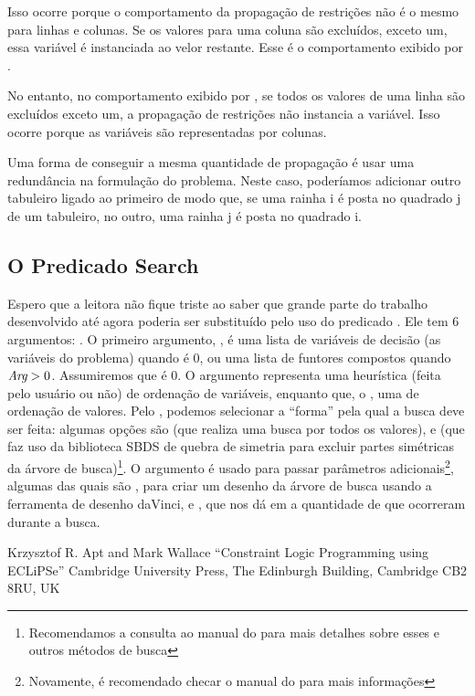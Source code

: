 \documentclass{article}
\begin{document}
Isso ocorre porque o comportamento da propagação de restrições não é o mesmo para linhas e colunas.
Se os valores para uma coluna são excluídos, exceto um, essa variável é instanciada ao velor
restante. Esse é o comportamento exibido por .

No entanto, no comportamento exibido por , se todos os valores de uma linha
são excluídos exceto um, a propagação de restrições não instancia a variável. Isso ocorre porque as
variáveis são representadas por colunas.

Uma forma de conseguir a mesma quantidade de propagação é usar uma redundância na formulação do
problema. Neste caso, poderíamos adicionar outro tabuleiro ligado ao primeiro de modo que, se uma
rainha i é posta no quadrado j de um tabuleiro, no outro, uma rainha j é posta no quadrado i.

\subsection{O Predicado Search}

Espero que a leitora não fique triste ao saber que grande parte do trabalho desenvolvido até agora
poderia ser substituído pelo uso do predicado . Ele tem 6 argumentos:
. O primeiro argumento,
, é uma lista de variáveis de decisão (as variáveis do problema) quando  é 0, ou
uma lista de funtores compostos quando $\textit{Arg} > 0$. Assumiremos que  é 0. O argumento 
representa uma heurística (feita pelo usuário ou não) de ordenação de variáveis, enquanto que, o
, uma de ordenação de valores. Pelo , podemos selecionar a ``forma'' pela
qual a busca deve ser feita: algumas opções são  (que realiza uma busca por
todos os valores), e  (que faz uso da biblioteca SBDS de quebra de simetria para
excluir partes simétricas da árvore de busca)\footnote{Recomendamos a consulta ao manual do \eclipse
para mais detalhes sobre esses e outros métodos de busca}. O argumento  é usado para
passar parâmetros adicionais\footnote{Novamente, é recomendado checar o manual do \eclipse para mais
informações}, algumas das quais são , para criar um desenho da
árvore de busca usando a ferramenta de desenho daVinci, e , que nos dá em
 a quantidade de  que ocorreram durante a busca.




  \begin{thebibliography}{2}

    Krzysztof R. Apt and Mark Wallace
    ``Constraint Logic Programming using ECLiPSe''
    Cambridge University Press,
    The Edinburgh Building, Cambridge CB2 8RU, UK


  \end{thebibliography}
\end{document}
